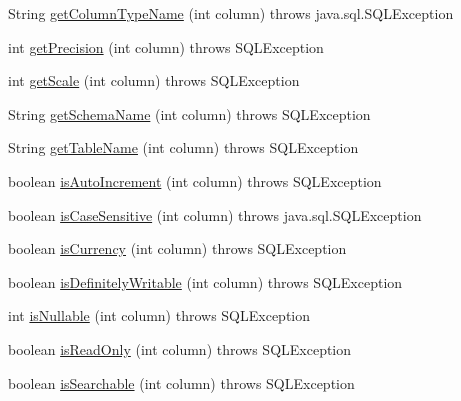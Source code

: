 \begin{DoxyCompactItemize}
\item 
String \mbox{\hyperlink{classcom_1_1mysql_1_1jdbc_1_1_result_set_meta_data_a05b1032063c16ac751c62342fdaee172}{get\+Column\+Type\+Name}} (int column)  throws java.\+sql.\+S\+Q\+L\+Exception 
\item 
int \mbox{\hyperlink{classcom_1_1mysql_1_1jdbc_1_1_result_set_meta_data_a205a18c21baf8e3815dc3d252229abc4}{get\+Precision}} (int column)  throws S\+Q\+L\+Exception 
\item 
int \mbox{\hyperlink{classcom_1_1mysql_1_1jdbc_1_1_result_set_meta_data_a758eaa931a2255393d83a424546c5b1b}{get\+Scale}} (int column)  throws S\+Q\+L\+Exception 
\item 
String \mbox{\hyperlink{classcom_1_1mysql_1_1jdbc_1_1_result_set_meta_data_ad018cc38893e21611da91476268d5369}{get\+Schema\+Name}} (int column)  throws S\+Q\+L\+Exception 
\item 
String \mbox{\hyperlink{classcom_1_1mysql_1_1jdbc_1_1_result_set_meta_data_a7b6a0a4f9aa6cc3901bfeb54c85fe888}{get\+Table\+Name}} (int column)  throws S\+Q\+L\+Exception 
\item 
boolean \mbox{\hyperlink{classcom_1_1mysql_1_1jdbc_1_1_result_set_meta_data_a41595c3fea85831fc2350ef5041bf489}{is\+Auto\+Increment}} (int column)  throws S\+Q\+L\+Exception 
\item 
boolean \mbox{\hyperlink{classcom_1_1mysql_1_1jdbc_1_1_result_set_meta_data_a34d591e0699ad43b0ce73806856460d0}{is\+Case\+Sensitive}} (int column)  throws java.\+sql.\+S\+Q\+L\+Exception 
\item 
boolean \mbox{\hyperlink{classcom_1_1mysql_1_1jdbc_1_1_result_set_meta_data_a4d62a9100c2c29bd364a8ded3f3f68d1}{is\+Currency}} (int column)  throws S\+Q\+L\+Exception 
\item 
boolean \mbox{\hyperlink{classcom_1_1mysql_1_1jdbc_1_1_result_set_meta_data_a5b118f6ee07908b8ba7983948bea557f}{is\+Definitely\+Writable}} (int column)  throws S\+Q\+L\+Exception 
\item 
int \mbox{\hyperlink{classcom_1_1mysql_1_1jdbc_1_1_result_set_meta_data_a40067f0bf2d16b2809974ebac6445d23}{is\+Nullable}} (int column)  throws S\+Q\+L\+Exception 
\item 
boolean \mbox{\hyperlink{classcom_1_1mysql_1_1jdbc_1_1_result_set_meta_data_aa55679657c2de6748866bdb7edae014d}{is\+Read\+Only}} (int column)  throws S\+Q\+L\+Exception 
\item 
boolean \mbox{\hyperlink{classcom_1_1mysql_1_1jdbc_1_1_result_set_meta_data_aba01f7ef04aae64a55c7b6d1b27a9b5e}{is\+Searchable}} (int column)  throws S\+Q\+L\+Exception 

\end{DoxyCompactItemize}
